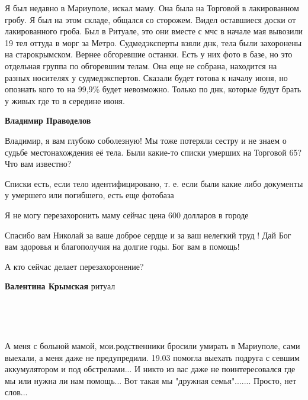 
Я был недавно в Мариуполе, искал маму. Она была на Торговой в лакированном
гробу. Я был на этом складе, общался со сторожем. Видел оставшиеся доски от
лакированного гроба. Был в Ритуале, это они вместе с мчс в начале мая вывозили 19
тел оттуда в морг за Метро. Судмедэксперты взяли днк, тела были захоронены на
старокрымском. Вернее обгоревшие останки. Есть у них фото в базе, но это отдельная
группа по обгоревшим телам. Она еще не собрана, находится на разных носителях у
судмедэкспертов. Сказали будет готова к началу июня, но опознать кого то на 99,9\%
будет невозможно. Только по днк, которые будут брать у живых где то в середине
июня.

\begin{itemize} %
\textbf{Владимир Праводелов} 

Владимир, я вам глубоко соболезную! Мы тоже потеряли сестру и не знаем о судьбе
местонахождения её тела. Были какие-то списки умерших на Торговой 65? Что вам
известно?


Списки есть, если тело идентифицировано, т. е. если были какие либо документы у
умершего или погибшего, есть еще фотобаза
\end{itemize} %


Я не могу перезахоронить маму сейчас цена 600 долларов в городе


Спасибо вам Николай за ваше доброе сердце и за ваш нелегкий труд ! Дай Бог вам
здоровья и благополучия на долгие годы. Бог вам в помощь!




А кто сейчас делает перезахоронение?

\begin{itemize} %
\textbf{Валентина Крымская} ритуал
\end{itemize} %

🙏 🙏 🙏

🙏🏻


А меня с больной мамой, мои.родственники бросили умирать в Мариуполе, сами
выехали, а меня даже не предупредили. 19.03 помогла выехать подруга с севшим
аккумулятором и под обстрелами... И никто из вас даже не поинтересовался где мы
или нужна ли нам помощь... Вот такая мы "дружная семья"....... Просто, нет
слов...

